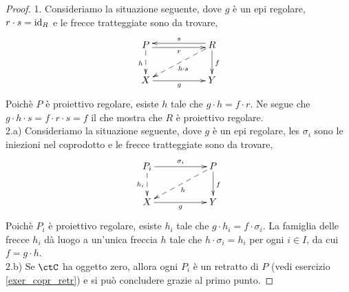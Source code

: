 \begin{proof}
 1. Consideriamo la situazione seguente, dove \(g\) è un epi regolare, \(r \cdot s = \mathrm{id}_R\) e le frecce tratteggiate sono da trovare,
 \[\xymatrix{P \ar@<-0.5ex>[rr]_-{r} \ar@{-->}[d]_{h} & & R \ar@<-0.5ex>[ll]_-{s} \ar[d]^{f} \ar@{-->}[lld]^{h \cdot s} \\
  X \ar[rr]_-{g} & & Y}\]
 Poichè \(P\) è proiettivo regolare, esiste \(h\) tale che \(g \cdot h = f \cdot r\). Ne segue che \(g \cdot h \cdot s = f \cdot r \cdot s = f\)
 il che mostra che \(R\) è proiettivo regolare. \\
 2.a) Consideriamo la situazione seguente, dove \(g\) è un epi regolare, les \(\sigma_i\) sono le iniezioni nel coprodotto e le frecce
 tratteggiate sono da trovare,
 \[\xymatrix{P_i \ar@{-->}[d]_{h_i} \ar[rr]^-{\sigma_i} & & P \ar[d]^{f} \ar@{-->}[lld]^{h} \\
  X \ar[rr]_-{g} & & Y}\]
 Poichè \(P_i\) è proiettivo regolare, esiste \(h_i\) tale che \(g \cdot h_i = f \cdot \sigma_i\). La famiglia delle frecce \(h_i\) dà luogo
 a un'unica freccia \(h\) tale che \(h \cdot \sigma_i = h_i\) per ogni \(i \in I\), da cui \(f = g \cdot h\). \\
 2.b) Se \(\ctC\) ha oggetto zero, allora ogni \(P_i\) è un retratto di \(P\) (vedi esercizio \ref{exer_copr_retr})
 e si può concludere grazie al primo punto.
\end{proof}


